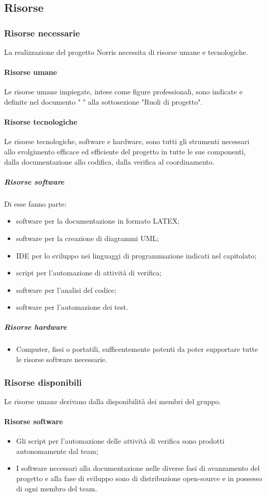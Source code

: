 	\subsection{Risorse}
	\subsubsection{Risorse necessarie}
	La realizzazione del progetto Norris necessita di risorse umane e tecnologiche.
	\paragraph{Risorse umane}
		Le risorse umane impiegate, intese come figure professionali, sono indicate e definite nel documento " \lastversion" alla sottosezione "Ruoli di progetto".
	\paragraph{Risorse tecnologiche}
		Le risorse tecnologiche, software e hardware, sono tutti gli strumenti necessari allo svolgimento efficace ed efficiente del progetto in tutte le sue componenti, dalla documentazione allo codifica, dalla verifica al coordinamento.
		\subparagraph{Risorse software}
		Di esse fanno parte:
			\begin{itemize}
				\item software per la documentazione in formato LATEX;
				\item software per la creazione di diagrammi UML;
				\item IDE per lo sviluppo nei linguaggi di programmazione indicati nel capitolato;
				\item script per l'automazione di attività di verifica;
				\item software per l'analisi del codice;
				\item software per l'automazione dei test.
			\end{itemize}
		\subparagraph{Risorse hardware}
			\begin{itemize}
				\item Computer, fissi o portatili, sufficentemente potenti da poter supportare tutte le risorse software necessarie.
			\end{itemize}
	\subsubsection{Risorse disponibili}
	Le risorse umane derivano dalla disponibilità dei membri del gruppo.
	\paragraph{Risorse software}
		\begin{itemize}
			\item Gli script per l'automazione delle attività di verifica sono prodotti autonomamente dal team;
			\item I software necessari alla documentazione nelle diverse fasi di avanzamento  del progetto e alla fase di sviluppo sono di distribuzione open-source e in possesso di ogni membro del team.
		\end{itemize}
